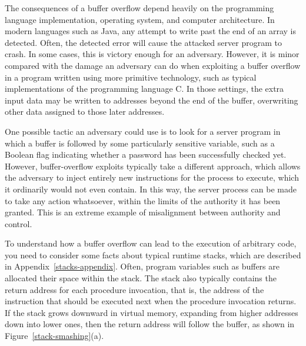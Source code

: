 The consequences of a buffer overflow depend heavily on the
programming language implementation, operating system, and computer
architecture.  In modern languages such as Java, any attempt to write
past the end of an array is detected.  Often, the detected error will
cause the attacked server program to crash.  In some cases, this is
victory enough for an adversary.  However, it is minor compared with
the damage an adversary can do when exploiting a buffer overflow in a
program written using more primitive technology, such as typical
implementations of the programming language C.  In those settings, the
extra input data may be written to addresses beyond the end of the
buffer, overwriting other data assigned to those later addresses.

One possible tactic an adversary could use is to look for a server
program in which a buffer is followed by some particularly sensitive
variable, such as a Boolean flag indicating whether a password has
been successfully checked yet.  However, buffer-overflow exploits
typically take a different approach, which allows the adversary 
to inject entirely new instructions for the process to execute, which
it ordinarily would not even contain.  In this way, the server process
can be made to take any action whatsoever, within the limits of the
authority it has been granted.  This is an extreme example of
misalignment between authority and control.

To understand how a buffer overflow can lead to the execution of
arbitrary code, you need to consider some facts about typical runtime
stacks, which are described in Appendix~\ref{stacks-appendix}.  Often, program
variables such as buffers are allocated their space within the stack.
The stack also typically contains the return address for each
procedure invocation, that is, the address of the instruction that
should be executed next when the procedure invocation returns.  If the
stack grows downward in virtual memory, expanding from higher
addresses down into lower ones, then the return address will follow
the buffer, as shown in Figure~\ref{stack-smashing}(a).

